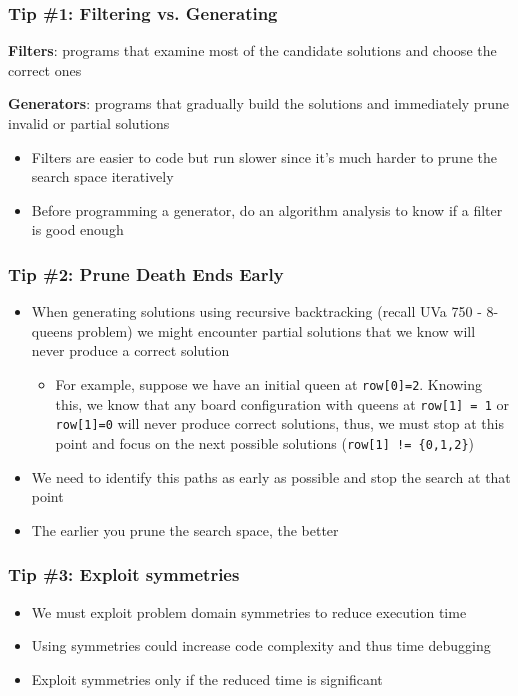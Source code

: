 \documentclass{beamer}
\begin{document}
\begin{frame}[fragile]
\frametitle{Tip \#1: Filtering vs. Generating}

\color{blue}\textbf{Filters}\color{black}: programs that examine most of the candidate solutions and choose the correct ones \\ \vspace{0.3cm}

\color{blue}\textbf{Generators}\color{black}: programs that gradually build the solutions and immediately prune invalid or partial solutions \\ \vspace{0.3cm}

\begin{itemize}
    \item Filters are easier to code but run slower since it's much harder to prune the search space iteratively
    \item Before programming a generator, do an algorithm analysis to know if a filter is good enough
\end{itemize}
	
\end{frame}

\begin{frame}[fragile]
\frametitle{Tip \#2: Prune Death Ends Early}

\begin{itemize}
    \item When generating solutions using recursive backtracking (recall UVa 750 - 8-queens problem) we might encounter partial solutions that we know will never produce a correct solution
    	\begin{itemize}
		    \item For example, suppose we have an initial queen at \verb|row[0]=2|. Knowing this, we know that any board configuration with queens at \verb|row[1] = 1| or \verb|row[1]=0| will never produce correct solutions, thus, we must stop at this point and focus on the next possible solutions (\verb|row[1] != {0,1,2}|)
		\end{itemize}
    \item We need to identify this paths as early as possible and stop the search at that point
    \item \color{blue}The earlier you prune the search space, the better\color{black}
\end{itemize}

\end{frame}

\begin{frame}[fragile]
\frametitle{Tip \#3: Exploit symmetries}

\begin{itemize}
    \item We must exploit problem domain symmetries to reduce execution time
	\item Using symmetries could increase code complexity and thus time debugging
	\item \color{blue}Exploit symmetries only if the reduced time is significant\color{black}
\end{itemize}

\end{frame}
\end{document}
